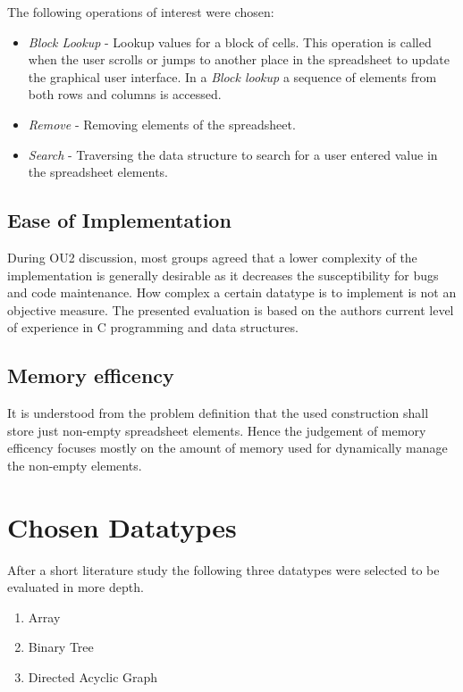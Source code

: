 \documentclass[a4paper,11pt,twoside]{article}
\begin{document}
The following operations of interest were chosen:

\begin{itemize}
\item \textit{Block Lookup} - Lookup values for a block of cells. This operation
  is called when the user scrolls or jumps to another
  place in the spreadsheet to update the graphical user interface. 
  In a \textit{Block lookup} a sequence of elements from both rows and
  columns is accessed. 
\item \textit{Remove} - Removing elements of the spreadsheet.
\item \textit{Search} - Traversing the data structure to search for a
  user entered value in the spreadsheet elements. 
\end{itemize}

\subsection{Ease of Implementation}
During OU2 discussion, most groups agreed that a lower complexity
of the implementation is generally desirable as it decreases the
susceptibility for bugs and code maintenance. How complex a certain
datatype is to implement is not an objective measure. The presented
evaluation is based on the authors current level of experience in C
programming and data structures. 


\subsection{Memory efficency}
It is understood from the problem definition that the used
construction shall store just non-empty spreadsheet elements. Hence
the judgement of memory efficency focuses mostly on the amount of
memory used for dynamically manage the non-empty elements.

\section{Chosen Datatypes}
After a short literature study the following three datatypes were
selected to be evaluated in more depth.

\begin{enumerate}
\item Array
\item Binary Tree
\item Directed Acyclic Graph
\end{enumerate}
\end{document}
